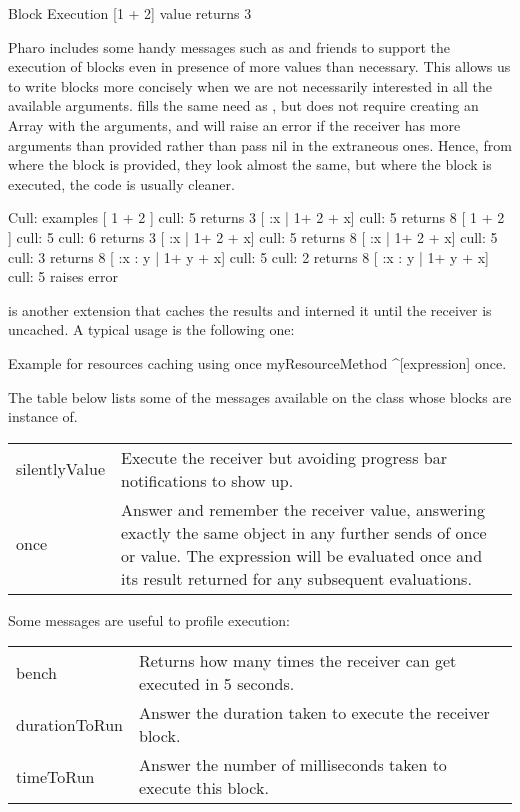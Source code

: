 \documentclass[a4paper,10pt,twoside]{book}
\begin{document}
\begin{code}{Block Execution}
[1 + 2] value  
    returns 3
\end{code}


Pharo includes some handy messages such as  and friends to support the execution of blocks even in presence of more values than necessary. This allows us to write blocks more concisely when we are not necessarily interested in all the available arguments.
 fills the same need as  , but does not require creating an Array with the arguments, and will raise an error if the receiver has more arguments than provided rather than pass nil in the extraneous ones.
Hence, from where the block is provided, they look almost the same, but where the block is executed, the code is usually cleaner.


\begin{code}{Cull: examples}
[ 1 + 2 ] cull: 5
	returns 3
[ :x | 1+ 2 + x] cull: 5 
	returns 8
[ 1 + 2 ] cull: 5 cull: 6
	returns 3
[ :x | 1+ 2 + x] cull: 5 
	returns 8
[ :x | 1+ 2 + x] cull: 5 cull: 3	
	returns 8 
[ :x : y | 1+ y + x] cull: 5 cull: 2 
	returns 8
[ :x : y | 1+ y + x] cull: 5 
	raises error
\end{code}

 is another extension that caches the results and interned it until the receiver is uncached.
A typical usage is the following one:

\begin{method}{Example for resources caching using once}
myResourceMethod
	^[expression] once.
\end{method}

The table below lists some of the messages available on the class  whose blocks are instance of. 
 
\begin{tabular}{p{2cm}|p{8cm}}
\textsf{silentlyValue}&Execute the receiver but avoiding progress bar notifications to show up.\\
\textsf{once}&Answer and remember the receiver value, answering exactly the same object in any further sends
	 of once or value. The expression will be evaluated once and its result returned for any subsequent evaluations.\\
\end{tabular}

Some messages are useful to profile execution: 

\begin{tabular}{p{2cm}|p{8cm}}
\textsf{bench}&Returns how many times the receiver can get executed in 5 seconds. \\
\textsf{durationToRun}& Answer the duration taken to execute the receiver block.\\
\textsf{timeToRun}&Answer the number of milliseconds taken to execute this block.\\
\end{tabular}
\end{document}
